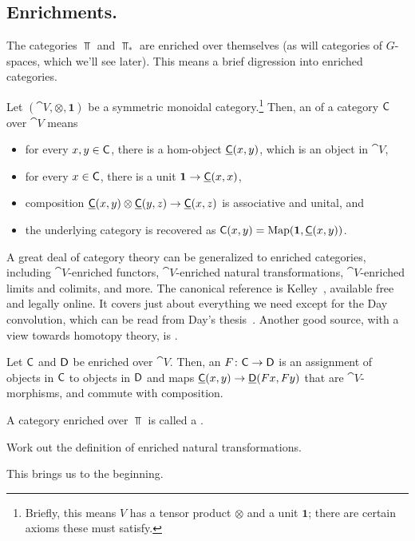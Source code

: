 \subsection*{Enrichments.}
The categories $\Top$ and $\Top_*$ are enriched over themselves (as will categories of $G$-spaces, which we'll see
later). This means a brief digression into enriched categories.
\begin{defn}
Let $(\cat V,\otimes, \boldsymbol 1)$ be a symmetric monoidal category.\footnote{Briefly, this means $V$ has a
tensor product $\otimes$ and a unit $\boldsymbol 1$; there are certain axioms these must satisfy.} Then, an
 of a category $\mathsf C$ over $\cat V$ means
\begin{itemize}
	\item for every $x,y\in\mathsf C$, there is a hom-object $\underline{\mathsf C}(x,y)$, which is an object in $\cat V$,
	\item for every $x\in\mathsf C$, there is a unit $\boldsymbol 1\to\underline{\mathsf C}(x,x)$,
	\item composition $\underline{\mathsf C}(x,y)\otimes\underline{\mathsf C}(y,z)\to\underline{\mathsf C}(x,z)$ is associative and unital,
	and
	\item the underlying category is recovered as $\mathsf C(x,y) = \operatorname{Map}(\boldsymbol 1, \underline{\mathsf C}(x,y))$.
\end{itemize}
\end{defn}
A great deal of category theory can be generalized to enriched categories, including $\cat V$-enriched functors,
$\cat V$-enriched natural transformations, $\cat V$-enriched limits and colimits, and more. The canonical reference
is Kelley~\cite{Kelley}, available free and legally online. It covers just about everything we need except for the
Day convolution, which can be read from Day's thesis~\cite{DayThesis}. Another good source, with a view towards homotopy theory, is \cite[Chapter 3]{RiehlCHT}.
\begin{defn}
Let $\mathsf C$ and $\mathsf D$ be enriched over $\cat V$. Then, an  $F\colon\mathsf C\to\mathsf D$ is an assignment
of objects in $\mathsf C$ to objects in $\mathsf D$ and maps $\underline{\mathsf C}(x,y)\to\underline{\mathsf D}(Fx, Fy)$ that are $\cat
V$-morphisms, and commute with composition.
\end{defn}
A category enriched over $\Top$ is called a .
\begin{ex}
Work out the definition of enriched natural transformations.
\end{ex}
This brings us to the beginning.


